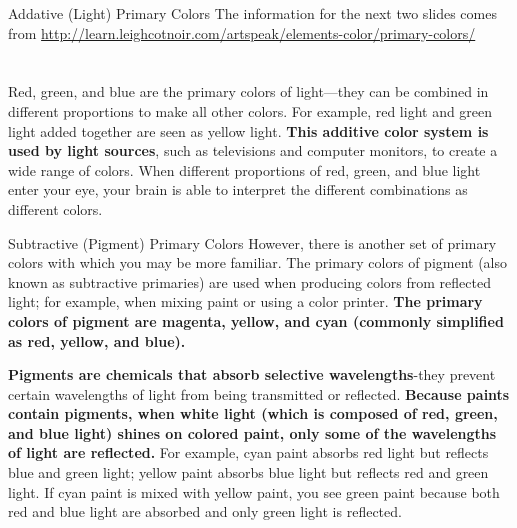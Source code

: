 \documentclass{beamer}
\begin{document}
\begin{frame}{Addative (Light) Primary Colors}
   The information for the next two slides comes from \href{http://learn.leighcotnoir.com/artspeak/elements-color/primary-colors/}{http://learn.leighcotnoir.com/artspeak/elements-color/primary-colors/} \\~\\~\\

   Red, green, and blue are the primary colors of light—they can be combined in different proportions to make all other colors. For example, red light and green light added together are seen as yellow light. {\bf This additive color system is used by light sources}, such as televisions and computer monitors, to create a wide range of colors. When different proportions of red, green, and blue light enter your eye, your brain is able to interpret the different combinations as different colors.
\end{frame}

\begin{frame}{Subtractive (Pigment) Primary Colors}
   However, there is another set of primary colors with which you may be more familiar. The primary colors of pigment (also known as subtractive primaries) are used when producing colors from reflected light; for example, when mixing paint or using a color printer. {\bf The primary colors of pigment are magenta, yellow, and cyan (commonly simplified as red, yellow, and blue).}

   {\bf Pigments are chemicals that absorb selective wavelengths}-they prevent certain wavelengths of light from being transmitted or reflected. {\bf Because paints contain pigments, when white light (which is composed of red, green, and blue light) shines on colored paint, only some of the wavelengths of light are reflected.} For example, cyan paint absorbs red light but reflects blue and green light; yellow paint absorbs blue light but reflects red and green light. If cyan paint is mixed with yellow paint, you see green paint because both red and blue light are absorbed and only green light is reflected.
\end{frame}
\end{document}

